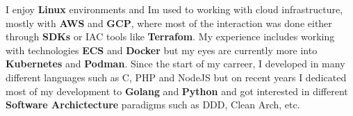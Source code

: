 

%
\begin{cventries}

  \cventry
  {}
  {}
  {}
  {}
    { I enjoy \textbf{Linux} environments and Im used to working with cloud infrastructure, mostly with \textbf{AWS} and \textbf{GCP}, where most of the interaction was done either through \textbf{SDKs} or IAC tools like \textbf{Terrafom}. My experience includes working with technologies \textbf{ECS} and \textbf{Docker} but my eyes are currently more into \textbf{Kubernetes} and \textbf{Podman}. Since the start of my carreer, I developed in many different languages such as C, PHP and NodeJS but on recent years I dedicated most of my development to \textbf{Golang} and \textbf{Python} and got interested in different \textbf{Software Archictecture} paradigms such as DDD, Clean Arch, etc.}
\end{cventries}
